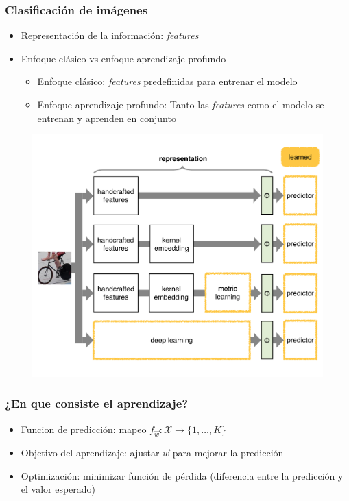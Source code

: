 \documentclass[10pt,center]{beamer}
\begin{document}
\begin{frame}
  \frametitle{Clasificación de imágenes}
  \begin{itemize}
    \item Representación de la información: \textit{features}
    \item Enfoque clásico vs enfoque aprendizaje profundo
    \begin{itemize}
      \item Enfoque clásico: \textit{features} predefinidas para entrenar el modelo
      \item Enfoque aprendizaje profundo: Tanto las \textit{features} como el modelo se entrenan y aprenden en conjunto
    \end{itemize}
  \end{itemize}
  \begin{figure}[h]
    \begin{center}
	    \includegraphics[height=0.6\textheight]{./img/vedaldi_shallow_deep.pdf}
    \end{center}
  \end{figure}
\end{frame}

\begin{frame}
  \frametitle{¿En que consiste el aprendizaje?}
  \begin{itemize}
    \item Funcion de predicción: mapeo $f_{\overrightarrow{w}}: \mathcal{X} {\rightarrow} \{1,\dots,K\}$
    \item Objetivo del aprendizaje: ajustar $\overrightarrow{w}$ para mejorar la predicción
    \item Optimización: minimizar función de pérdida (diferencia entre la predicción y el valor esperado)
  \end{itemize}
\end{frame}
\end{document}
